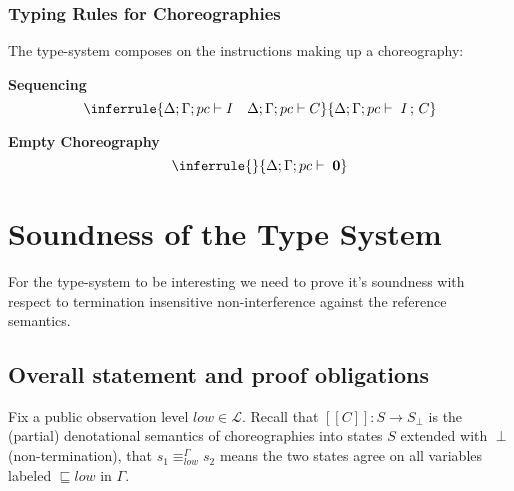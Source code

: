 \documentclass[12pt,a4paper,twoside]{book}
\newcommand{\llbracket}{[\![}
\newcommand{\rrbracket}{]\!]}
\newcommand{\MCL}{\mathscr{L}}
\begin{document}
\subsection{Typing Rules for Choreographies}
The type-system composes on the instructions making up a choreography:

\medskip
\noindent\textbf{Sequencing}
\[
  \inferrule
  { \Delta;\Gamma;pc \vdash I \quad \Delta;\Gamma;pc \vdash C }
  { \Delta;\Gamma;pc \vdash \; I \,;\, C }
\]

\medskip
\noindent\textbf{Empty Choreography}
\[
  \inferrule
  {}{\Delta;\Gamma;pc \vdash \; \boldsymbol{0}}
\]

\chapter{Soundness of the Type System}
For the type-system to be interesting we need to prove it's soundness with respect to termination insensitive non-interference against the reference semantics.

\section{Overall statement and proof obligations}

Fix a public observation level \(low \in \MCL\).
Recall that \( \llbracket C \rrbracket : S \to S_\perp \) is the (partial) denotational semantics of choreographies into states \(S\) extended with \(\perp\) (non-termination), that \(s_1 \equiv^\Gamma_{low} s_2\) means the two states agree on all variables labeled \(\sqsubseteq low\) in $\Gamma$.
\end{document}
